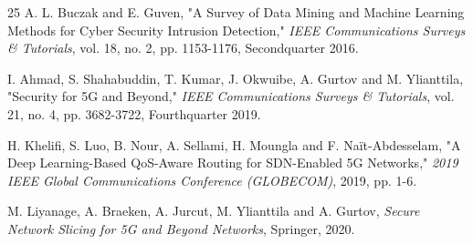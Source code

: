 \documentclass[12pt]{article}
\begin{document}
\begin{thebibliography}{25}
A. L. Buczak and E. Guven, 
"A Survey of Data Mining and Machine Learning Methods for Cyber Security Intrusion Detection," 
\textit{IEEE Communications Surveys \& Tutorials}, vol. 18, no. 2, pp. 1153-1176, Secondquarter 2016.

I. Ahmad, S. Shahabuddin, T. Kumar, J. Okwuibe, A. Gurtov and M. Ylianttila, 
"Security for 5G and Beyond," 
\textit{IEEE Communications Surveys \& Tutorials}, vol. 21, no. 4, pp. 3682-3722, Fourthquarter 2019.

H. Khelifi, S. Luo, B. Nour, A. Sellami, H. Moungla and F. Naït-Abdesselam, 
"A Deep Learning-Based QoS-Aware Routing for SDN-Enabled 5G Networks," 
\textit{2019 IEEE Global Communications Conference (GLOBECOM)}, 2019, pp. 1-6.

M. Liyanage, A. Braeken, A. Jurcut, M. Ylianttila and A. Gurtov, 
\textit{Secure Network Slicing for 5G and Beyond Networks}, 
Springer, 2020.

\end{thebibliography}
\end{document}
